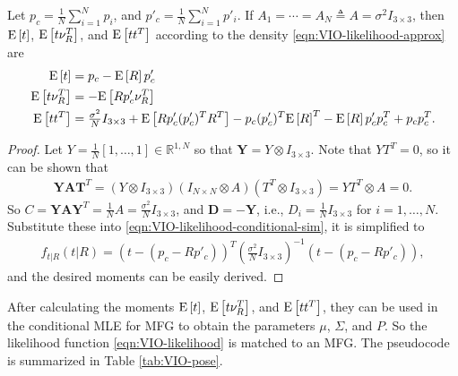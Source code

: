 \begin{theorem} \label{thm:VIO-conditional-sim}
	Let $p_c = \tfrac{1}{N}\sum_{i=1}^N p_i$, and $p'_c = \tfrac{1}{N}\sum_{i=1}^N p'_i$.
	If $A_1 = \cdots = A_N \triangleq A = \sigma^2I_{3\times 3}$, then $\mathrm{E}\left[ t \right]$, $\mathrm{E}\left[ t\nu_R^T \right]$, and $\mathrm{E}\left[ tt^T \right]$ according to the density \eqref{eqn:VIO-likelihood-approx} are
	\begin{align}
		\mathrm{E}\left[ t \right] &= p_c - \mathrm{E}\left[ R \right]p'_c \\
		\mathrm{E}\left[ t\nu_R^T \right] &= -\mathrm{E}\left[ Rp'_c\nu_R^T \right] \\
		\mathrm{E}\left[ tt^T \right] &= \tfrac{\sigma^2}{N}I_{3\times 3} + \mathrm{E}\left[ Rp'_c(p'_c)^TR^T \right] - p_c(p'_c)^T\mathrm{E}\left[ R \right]^T - \mathrm{E}\left[ R \right]p'_cp_c^T + p_cp_c^T.
	\end{align}
\end{theorem}
\begin{proof}
	Let $Y = \tfrac{1}{N}[1,\ldots,1]\in\mathbb{R}^{1,N}$ so that $\mathbf{Y} = Y\otimes I_{3\times 3}$.
	Note that $YT^T = 0$, so it can be shown that
	\begin{align*}
		\mathbf{YAT}^T = (Y\otimes I_{3\times 3})(I_{N\times N}\otimes A) (T^T\otimes I_{3\times 3}) = YT^T\otimes A = 0.
	\end{align*}
	So $C = \mathbf{YAY}^T = \tfrac{1}{N}A = \tfrac{\sigma^2}{N} I_{3\times 3}$, and $\mathbf{D} = -\mathbf{Y}$, i.e., $D_i = \tfrac{1}{N}I_{3\times 3}$ for $i=1,\ldots,N$.
	Substitute these into \eqref{eqn:VIO-likelihood-conditional-sim}, it is simplified to
	\begin{align}
		f_{t|R}(t|R) = \left( t - (p_c-Rp'_c) \right)^T \left( \tfrac{\sigma^2}{N}I_{3\times 3} \right)^{-1} \left( t - (p_c-Rp'_c) \right),
	\end{align}
	and the desired moments can be easily derived.
\end{proof}

After calculating the moments $\mathrm{E}\left[ t \right]$, $\mathrm{E}\left[ t\nu_R^T \right]$, and $\mathrm{E}\left[ tt^T \right]$, they can be used in the conditional MLE for MFG to obtain the parameters $\mu$, $\Sigma$, and $P$.
So the likelihood function \eqref{eqn:VIO-likelihood} is matched to an MFG.
The pseudocode is summarized in Table \ref{tab:VIO-pose}.

